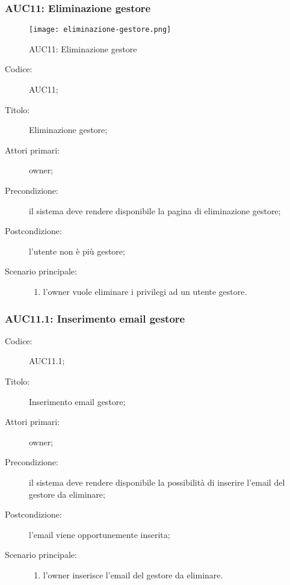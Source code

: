 \documentclass[../../../analisi-dei-requisiti.tex]{subfiles}
\begin{document}
\subsubsection{AUC11: Eliminazione gestore}%
\label{subs:AUC11}

\begin{figure}[H]
  \centering
  \texttt{[image: eliminazione-gestore.png]}
  \caption{AUC11: Eliminazione gestore}%
  \label{fig:AUC11}
\end{figure}

\begin{description}
  \item[Codice:] AUC11;
  \item[Titolo:] Eliminazione gestore;
  \item[Attori primari:] owner;
  \item[Precondizione:] il sistema deve rendere disponibile la pagina di eliminazione gestore;
  \item[Postcondizione:] l'utente non è più gestore;
  \item[Scenario principale:]
  \begin{enumerate}
    \item l'owner vuole eliminare i privilegi ad un utente gestore.
  \end{enumerate}
\end{description}

\subsubsection{AUC11.1: Inserimento email gestore}%
\label{subs:AUC11.1}
\begin{description}
  \item[Codice:] AUC11.1;
  \item[Titolo:] Inserimento email gestore;
  \item[Attori primari:] owner;
  \item[Precondizione:] il sistema deve rendere disponibile la possibilità di inserire l'email del gestore da eliminare;
  \item[Postcondizione:] l'email viene opportunemente inserita;
  \item[Scenario principale:]
  \begin{enumerate}
    \item l'owner inserisce l'email del gestore da eliminare.
  \end{enumerate}
\end{description}
\end{document}
